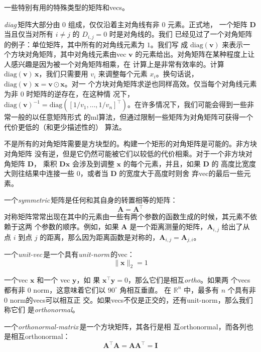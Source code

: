 一些特别有用的特殊类型的矩阵和\gls*{vecs}。

\emph{\gls{diag}}\,矩阵大部分由 $0$ 组成，仅仅沿着主对角线有非 $0$ 元素。正式地，
一个矩阵 $\pmb{D}$ 当且仅当对所有 $i \neq j$ 的 $D_{i,j} = 0$ 时是对角线的。我们
已经见过了一个对角矩阵的例子：单位矩阵，其中所有的对角线元素为 $1$。我们写
成 $\mathrm{diag}(\pmb{v})$ 来表示一个方块对角矩阵，其中对角线元素由\gls*{vec}
$\pmb{v}$ 的元素给出。对角矩阵在某种程度上让人感兴趣是因为被一个对角矩阵相乘，在
计算上是非常有效率的。计算 $\mathrm{diag}(\pmb{v})\,\pmb{x}$，我们只需要用 $v_i$
来调整每个元素
$x_i$。换句话说，$\mathrm{diag}(\pmb{v})\,\pmb{x} = \pmb{v} \odot \pmb{x}$。对一
个方块对角矩阵求逆也同样高效。仅当每个对角线元素为非 $0$ 时矩阵的逆存在，在这种情
况下，$\mathrm{diag}(\pmb{v})^{-1} = \mathrm{diag}([1/v_1, \ldots,
1/v_n]^{\top})$。在许多情况下，我们可能会得到一些非常一般的以任意矩阵形式
的\gls*{ml}算法，但通过限制一些矩阵为对角矩阵可获得一个代价更低的（和更少描述性的）
算法。

不是所有的对角矩阵需要是方块型的。构建一个矩形的对角矩阵是可能的。非方块对角矩阵
没有逆，但是它仍然可能被它们以较低的代价相乘。对于一个非方块对角矩阵 $\pmb{D}$，
乘积 $\pmb{D}\pmb{x}$ 会涉及到调整 $\pmb{x}$ 的每个元素，并且，如果 $\pmb{D}$ 的
高度比宽度大则往结果中连接一些 $0$，或者当 $\pmb{D}$ 的宽度大于高度时则舍
弃\gls*{vec}的最后一些元素。

一个\emph{\gls{symmetric}}\,矩阵是任何和其自身的转置相等的矩阵：
\begin{equation}
  \pmb{A} = \pmb{A}^{\top}
\end{equation}
对称矩阵常常出现在其中的元素由一些有两个参数的函数生成的时候，其元素不依赖于这两
个参数的顺序。例如，如果 $\pmb{A}$ 是一个距离测量的矩阵，$\pmb{A}_{i,j}$ 给出了从
点 $i$ 到点 $j$ 的距离，那么因为距离函数是对称的，$\pmb{A}_{i,j} =
\pmb{A}_{j,i}$。

一个\emph{\gls{unit-vec}}\,是一个具有\emph{\gls{unit-norm}}\,的\gls*{vec}：
\begin{equation}
  \|\pmb{x}\|_2 = 1
\end{equation}

一个\gls*{vec} $\pmb{x}$ 和一个 \gls*{vec} $\pmb{y}$，如
果 $\pmb{x}^{\top}\pmb{y} = 0$，那么它们是相互\emph{\gls{ortho}}。如果两
个\gls*{vecs}都有非 $0$ \gls*{norm}，这意味着它们以 $90^{\circ}$ 角相互垂直。
在 $\mathbb{R}^n$ 中，最多有 $n$ 个具有非 $0$ \gls*{norm}的\gls*{vecs}可以相互正
交。如果\gls*{vecs}不仅是正交的，还有\gls*{unit-norm}，那么我们称它们
是\emph{\gls{orthonormal}}。

一个\emph{\gls{orthonormal-matrix}}\,是一个方块矩阵，其各行是相
互\gls*{orthonormal}，而各列也是相互\gls*{orthonormal}：
\begin{equation}
  \pmb{A}^{\top}\pmb{A} = \pmb{A}\pmb{A}^{\top} = \pmb{I}
\end{equation}

